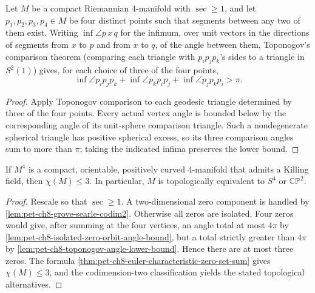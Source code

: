 \begin{lemma}
  \label{lem:pet-ch8-toponogov-angle-lower-bound}
  Let $M$ be a compact Riemannian $4$-manifold with $\sec\ge1$, and let
  $p_1,p_2,p_3,p_4\in M$ be four distinct points such that segments between any
  two of them exist. Writing $\inf\angle p\,x\,q$ for the infimum, over unit
  vectors in the directions of segments from $x$ to $p$ and from $x$ to $q$, of
  the angle between them, Toponogov's comparison theorem (comparing each
  triangle with $p_ip_jp_k$'s sides to a triangle in $S^2(1)$) gives, for each
  choice of three of the four points,
  \[
    \inf\angle p_ip_jp_k+\inf\angle p_kp_ip_j+\inf\angle p_jp_kp_i>\pi.
  \]
\end{lemma}
\begin{proof}
  \sketch
  Apply Toponogov comparison to each geodesic triangle determined by three of
  the four points. Every actual vertex angle is bounded below by the
  corresponding angle of its unit-sphere comparison triangle. Such a
  nondegenerate spherical triangle has positive spherical excess, so its three
  comparison angles sum to more than \(\pi\); taking the indicated infima
  preserves the lower bound.
\end{proof}

\begin{theorem}
  \label{thm:pet-ch8-hsiang-kleiner-4manifold}
  If $M^4$ is a compact, orientable, positively curved $4$-manifold that admits
  a Killing field, then $\chi(M)\le3$. In particular, $M$ is topologically
  equivalent to $S^4$ or $\mathbb{CP}^2$.
\end{theorem}
\begin{proof}
  \sketch
  Rescale so that \(\sec\ge1\). A two-dimensional zero component is handled by
  \cref{lem:pet-ch8-grove-searle-codim2}. Otherwise all zeros are isolated.
  Four zeros would give, after summing at the four vertices, an angle total at
  most \(4\pi\) by
  \cref{lem:pet-ch8-isolated-zero-orbit-angle-bound}, but a total strictly
  greater than \(4\pi\) by
  \cref{lem:pet-ch8-toponogov-angle-lower-bound}. Hence there are at most three
  zeros. The formula
  \cref{thm:pet-ch8-euler-characteristic-zero-set-sum} gives
  \(\chi(M)\le3\), and the codimension-two classification yields the stated
  topological alternatives.
\end{proof}

